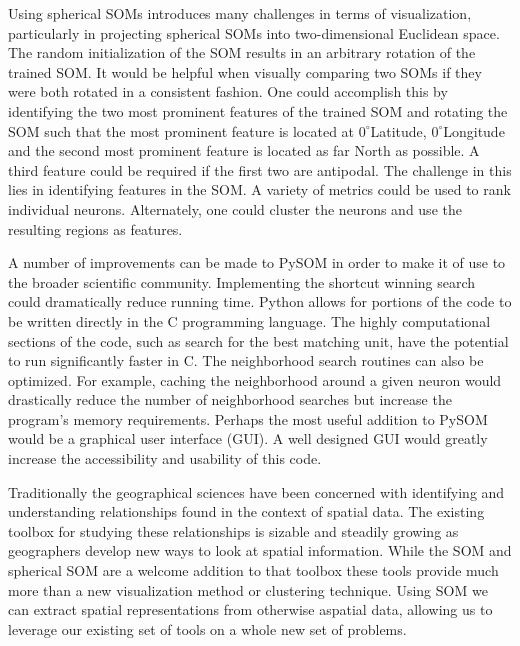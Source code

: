 Using spherical SOMs introduces many challenges in terms of visualization,
particularly in projecting spherical SOMs into two-dimensional Euclidean
space.  The random initialization of the SOM results in an arbitrary rotation of
the trained SOM.  It would be helpful when visually comparing two SOMs if they
were both rotated in a consistent fashion. One could accomplish this by identifying
the two most prominent features of the trained SOM and rotating the SOM such
that the most prominent feature is located at $0^\circ$Latitude,
$0^\circ$Longitude and the second most prominent feature is located as far North
as possible. A third feature could be required if the first two are antipodal.
The challenge in this lies in identifying features in the SOM.  A variety of
metrics could be used to rank individual neurons. Alternately, one could cluster
the neurons and use the resulting regions as features.

A number of improvements can be made to PySOM in order to make it of use to
the broader scientific community.  Implementing the shortcut winning search
could dramatically reduce running time.  Python allows for portions of the code
to be written directly in the C programming language.  The highly computational
sections of the code, such as search for the best matching unit, have the
potential to run significantly faster in C.  
The neighborhood search routines can also be optimized. For example, caching the neighborhood around a given neuron
would drastically reduce the number of neighborhood searches but increase the
program's memory requirements.  Perhaps the most useful addition to PySOM would
be a graphical user interface (GUI).  A well designed GUI would greatly increase the
accessibility and usability of this code.

Traditionally the geographical sciences have been concerned with identifying and
understanding relationships found in the context of spatial data.  
The existing toolbox for studying these relationships is sizable 
and steadily growing as geographers develop new ways to look at spatial
information.  While the SOM and spherical SOM are a welcome addition to that
toolbox these tools provide much more than a new visualization method or
clustering technique.  Using SOM we can extract spatial representations from
otherwise aspatial data, allowing us to leverage our existing set of
tools on a whole new set of problems.



